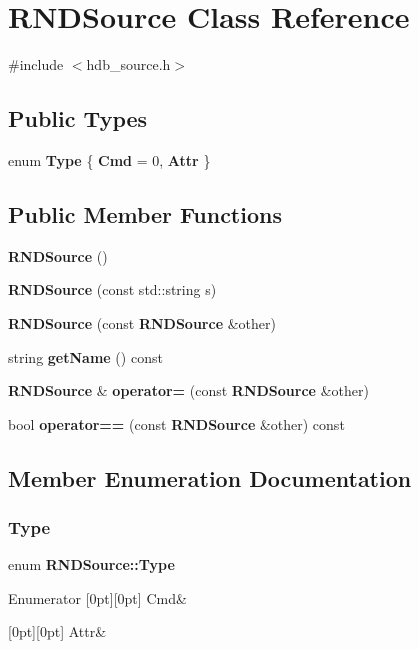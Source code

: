 \section{R\+N\+D\+Source Class Reference}
\label{classHdbSource}


{\ttfamily \#include $<$hdb\+\_\+source.\+h$>$}

\subsection*{Public Types}
\begin{DoxyCompactItemize}
\item 
enum \textbf{ Type} \{ \textbf{ Cmd} = 0, 
\textbf{ Attr}
 \}
\end{DoxyCompactItemize}
\subsection*{Public Member Functions}
\begin{DoxyCompactItemize}
\item 
\textbf{ R\+N\+D\+Source} ()
\item 
\textbf{ R\+N\+D\+Source} (const std\+::string s)
\item 
\textbf{ R\+N\+D\+Source} (const \textbf{ R\+N\+D\+Source} \&other)
\item 
string \textbf{ get\+Name} () const
\item 
\textbf{ R\+N\+D\+Source} \& \textbf{ operator=} (const \textbf{ R\+N\+D\+Source} \&other)
\item 
bool \textbf{ operator==} (const \textbf{ R\+N\+D\+Source} \&other) const
\end{DoxyCompactItemize}


\subsection{Member Enumeration Documentation}
\mbox{\label{classHdbSource_a89bb13e463ffd024fafb4eaa05fea031}} 
\subsubsection{Type}
{\footnotesize\ttfamily enum \textbf{ R\+N\+D\+Source\+::\+Type}}

\begin{DoxyEnumFields}{Enumerator}
[0pt][0pt]{}\mbox{\label{classHdbSource_a89bb13e463ffd024fafb4eaa05fea031a23a167a7ee7afa0cf80508af706bc467}} 
Cmd&\\
\hline

[0pt][0pt]{}\mbox{\label{classHdbSource_a89bb13e463ffd024fafb4eaa05fea031af8deaaf5a27298d57ec8b7e71e64bcbf}} 
Attr&\\
\hline

\end{DoxyEnumFields}


